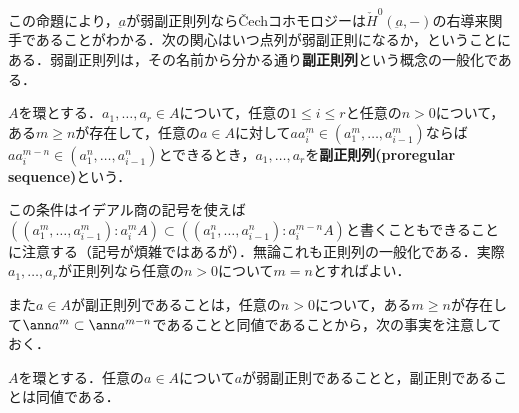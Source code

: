この命題により，$\underbar{a}$が弱副正則列なら\v{C}echコホモロジーは$\check{H}^0(\underbar{a},-)$の右導来関手であることがわかる．次の関心はいつ点列が弱副正則になるか，ということにある．弱副正則列は，その名前から分かる通り\textbf{副正則列}という概念の一般化である．

%

\begin{defi}
	$A$を環とする．$a_1,\dots,a_r\in A$について，任意の$1\leq i\leq r$と任意の$n>0$について，ある$m\geq n$が存在して，任意の$a\in A$に対して$a a_i^m\in(a_1^m,\dots,a_{i-1}^m)$ならば$a a_i^{m-n}\in(a_1^n,\dots,a_{i-1}^n)$とできるとき，$a_1,\dots,a_r$を\textbf{副正則列(proregular sequence)}という．
\end{defi}

この条件はイデアル商の記号を使えば$((a_1^m,\dots,a_{i-1}^m):a_i^m A)\subset((a_1^n,\dots,a_{i-1}^n):a_i^{m-n}A)$と書くこともできることに注意する（記号が煩雑ではあるが）．無論これも正則列の一般化である．実際$a_1,\dots,a_r$が正則列なら任意の$n>0$について$m=n$とすればよい．

また$a\in A$が副正則列であることは，任意の$n>0$について，ある$m\geq n$が存在して$\ann a^m\subset\ann a^{m-n}$であることと同値であることから，次の事実を注意しておく．

\begin{prop}
	$A$を環とする．任意の$a\in A$について$a$が弱副正則であることと，副正則であることは同値である．
\end{prop}

